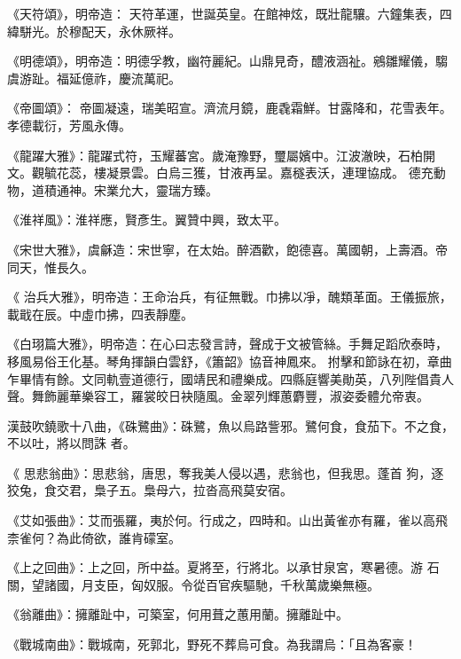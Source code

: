\begin{pinyinscope}
 《天符頌》，明帝造：
 天符革運，世誕英皇。在館神炫，既壯龍驤。六鐘集表，四緯駢光。於穆配天，永休厥祥。



 《明德頌》，明帝造：明德孚教，幽符麗紀。山鼎見奇，醴液涵祉。鵷雛耀儀，騶虞游趾。福延億祚，慶流萬祀。



 《帝圖頌》：
 帝圖凝遠，瑞美昭宣。濟流月鏡，鹿毳霜鮮。甘露降和，花雪表年。孝德載衍，芳風永傳。



 《龍躍大雅》：龍躍式符，玉耀蕃宮。歲淹豫野，璽屬嬪中。江波澈映，石柏開文。觀毓花蕊，樓凝景雲。白烏三獲，甘液再呈。嘉穟表沃，連理協成。
 德充動物，道積通神。宋業允大，靈瑞方臻。



 《淮祥風》：淮祥應，賢彥生。翼贊中興，致太平。



 《宋世大雅》，虞龢造：宋世寧，在太始。醉酒歡，飽德喜。萬國朝，上壽酒。帝同天，惟長久。



 《
 治兵大雅》，明帝造：王命治兵，有征無戰。巾拂以凈，醜類革面。王儀振旅，載戢在辰。中虛巾拂，四表靜塵。



 《白珝篇大雅》，明帝造：在心曰志發言詩，聲成于文被管絲。手舞足蹈欣泰時，移風易俗王化基。琴角揮韻白雲舒，《簫韶》協音神鳳來。
 拊擊和節詠在初，章曲乍畢情有餘。文同軌壹道德行，國靖民和禮樂成。四縣庭響美勛英，八列陛倡貴人聲。舞飾麗華樂容工，羅裳皎日袂隨風。金翠列輝蕙麝豐，淑姿委體允帝衷。


漢鼓吹鐃歌十八曲，《硃鷺曲》：硃鷺，魚以烏路訾邪。鷺何食，食茄下。不之食，不以吐，將以問誅
 者。


《
 思悲翁曲》：思悲翁，唐思，奪我美人侵以遇，悲翁也，但我思。蓬首
 狗，逐狡兔，食交君，梟子五。梟母六，拉沓高飛莫安宿。



 《艾如張曲》：艾而張羅，夷於何。行成之，四時和。山出黃雀亦有羅，雀以高飛柰雀何？為此倚欲，誰肯礞室。



 《上之回曲》：上之回，所中益。夏將至，行將北。以承甘泉宮，寒暑德。游
 石關，望諸國，月支臣，匈奴服。令從百官疾驅馳，千秋萬歲樂無極。



 《翁離曲》：擁離趾中，可築室，何用葺之蕙用蘭。擁離趾中。



 《戰城南曲》：戰城南，死郭北，野死不葬烏可食。為我謂烏：「且為客豪！




\end{pinyinscope}
